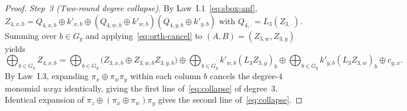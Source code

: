 \documentclass[11pt,a4paper]{article}
\theoremstyle{definition}
\theoremstyle{remark}
\begin{document}
\begin{proof}
\emph{Step~3 (Two-round degree collapse).} By Law~I.1~\eqref{eq:sbox-anf}, $Z_{4,x,b} = Q_{4,x,b} \oplus k'_{x,b} \oplus (Q_{4,w,b} \oplus k'_{w,b})(Q_{4,y,b} \oplus k'_{y,b})$ with $Q_{4,\cdot} = L_3(Z_{3,\cdot})$. Summing over $b \in G_g$ and applying~\eqref{eq:orth-cancel} to $(A,B) = (Z_{3,w}, Z_{3,y})$ yields
\[
\bigoplus_{b \in G_g} Z_{4,x,b} = \bigoplus_{b \in G_g} \bigl(Z_{3,x,b} \oplus Z_{3,w,b}Z_{3,y,b}\bigr) \oplus \bigoplus_{b \in G_g} k'_{w,b}(L_3 Z_{3,y})_b \oplus \bigoplus_{b \in G_g} k'_{y,b}(L_3 Z_{3,w})_b \oplus c_{g,x}.
\]
By Law~I.3, expanding $\pi_x \oplus \pi_w \pi_y$ within each column $b$ cancels the degree-$4$ monomial $wxyz$ identically, giving the first line of~\eqref{eq:collapse} of degree~$3$. Identical expansion of $\pi_z \oplus (\pi_x \oplus \pi_w)\pi_y$ gives the second line of~\eqref{eq:collapse}.
\end{proof}
\end{document}
